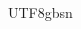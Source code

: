 \documentclass{ctexart}
\begin{document}
\begin{CJK*}{UTF8}{gbsn} 

\end{CJK*}{UTF8}{gbsn} 
\end{document}
